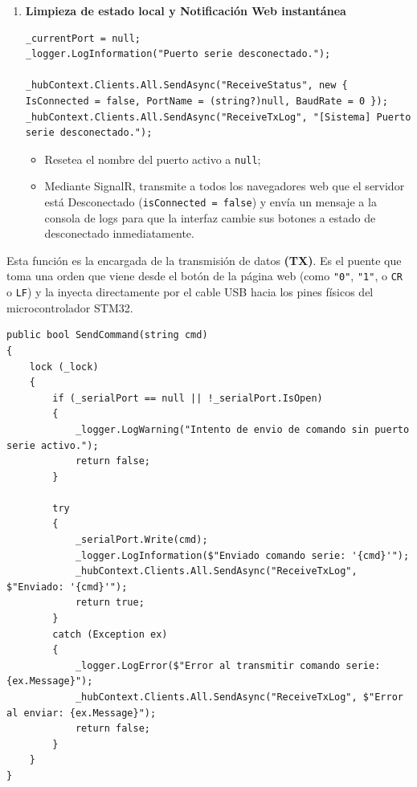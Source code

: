 \documentclass[
10pt, %
a4paper, %
oneside, %
headinclude,footinclude, %
BCOR5mm, %
]{scrartcl}
\begin{document}
\begin{enumerate}
\begin{itemize}
		\item \texttt{\_serialPort = null;}: Deja la variable limpia en \texttt{null} indicando que no hay ningún puerto enlazado.
	\end{itemize}
	\item \textbf{Limpieza de estado local y Notificación Web instantánea}
	\begin{lstlisting}[style=VSCodeDark]
_currentPort = null;
_logger.LogInformation("Puerto serie desconectado.");

_hubContext.Clients.All.SendAsync("ReceiveStatus", new { IsConnected = false, PortName = (string?)null, BaudRate = 0 });
_hubContext.Clients.All.SendAsync("ReceiveTxLog", "[Sistema] Puerto serie desconectado.");\end{lstlisting}
	\begin{itemize}
		\item Resetea el nombre del puerto activo a \texttt{null};
		\item Mediante SignalR, transmite a todos los navegadores web que el servidor está Desconectado (\texttt{isConnected = false}) y envía un mensaje a la consola de logs para que la interfaz cambie sus botones a estado de desconectado inmediatamente.
	\end{itemize}
\end{enumerate}

Esta función es la encargada de la transmisión de datos \textbf{(TX)}. Es el puente que toma una orden que viene desde el botón de la página web (como \texttt{"0"}, \texttt{"1"}, o \texttt{CR} o \texttt{LF}) y la inyecta directamente por el cable USB hacia los pines físicos del microcontrolador STM32.

\begin{lstlisting}[style=VSCodeDark]
public bool SendCommand(string cmd)
{
	lock (_lock)
	{
		if (_serialPort == null || !_serialPort.IsOpen)
		{
			_logger.LogWarning("Intento de envio de comando sin puerto serie activo.");
			return false;
		}
		
		try
		{
			_serialPort.Write(cmd);
			_logger.LogInformation($"Enviado comando serie: '{cmd}'");
			_hubContext.Clients.All.SendAsync("ReceiveTxLog", $"Enviado: '{cmd}'");
			return true;
		}
		catch (Exception ex)
		{
			_logger.LogError($"Error al transmitir comando serie: {ex.Message}");
			_hubContext.Clients.All.SendAsync("ReceiveTxLog", $"Error al enviar: {ex.Message}");
			return false;
		}
	}
}
\end{lstlisting}
\end{document}
